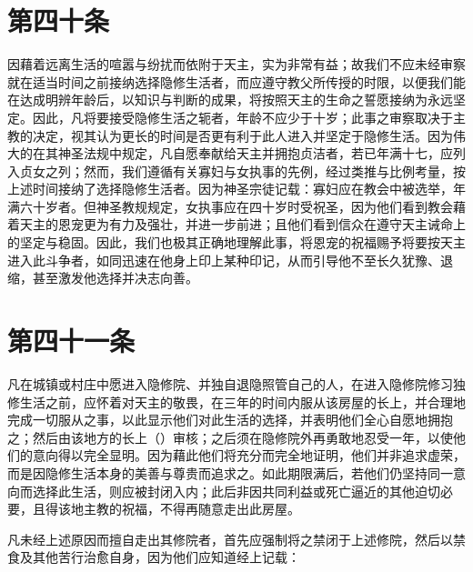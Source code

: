 \section{第四十条}

因藉着远离生活的喧嚣与纷扰而依附于天主，实为非常有益；故我们不应未经审察就在适当时间之前接纳选择隐修生活者，而应遵守教父所传授的时限，以便我们能在达成明辨年龄后，以知识与判断的成果，将按照天主的生命之誓愿接纳为永远坚定。因此，凡将要接受隐修生活之轭者，年龄不应少于十岁；此事之审察取决于主教的决定，视其认为更长的时间是否更有利于此人进入并坚定于隐修生活。因为伟大的在其神圣法规中规定，凡自愿奉献给天主并拥抱贞洁者，若已年满十七，应列入贞女之列；然而，我们遵循有关寡妇与女执事的先例，经过类推与比例考量，按上述时间接纳了选择隐修生活者。因为神圣宗徒记载：寡妇应在教会中被选举，年满六十岁者。但神圣教规规定，女执事应在四十岁时受祝圣，因为他们看到教会藉着天主的恩宠更为有力及强壮，并进一步前进；且他们看到信众在遵守天主诫命上的坚定与稳固。因此，我们也极其正确地理解此事，将恩宠的祝福赐予将要按天主进入此斗争者，如同迅速在他身上印上某种印记，从而引导他不至长久犹豫、退缩，甚至激发他选择并决志向善。\par


\section{第四十一条}

凡在城镇或村庄中愿进入隐修院、并独自退隐照管自己的人，在进入隐修院修习独修生活之前，应怀着对天主的敬畏，在三年的时间内服从该房屋的长上，并合理地完成一切服从之事，以此显示他们对此生活的选择，并表明他们全心自愿地拥抱之；然后由该地方的长上（）审核；之后须在隐修院外再勇敢地忍受一年，以使他们的意向得以完全显明。因为藉此他们将充分而完全地证明，他们并非追求虚荣，而是因隐修生活本身的美善与尊贵而追求之。如此期限满后，若他们仍坚持同一意向而选择此生活，则应被封闭入内；此后非因共同利益或死亡逼近的其他迫切必要，且得该地主教的祝福，不得再随意走出此房屋。\par

凡未经上述原因而擅自走出其修院者，首先应强制将之禁闭于上述修院，然后以禁食及其他苦行治愈自身，因为他们应知道经上记载：\par



